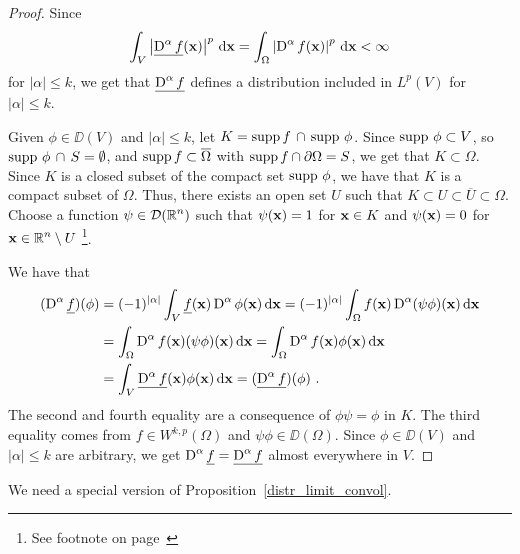\begin{proof}
Since
\[
\int_V \left|\underline{\operatorname{D}^\alpha f}(\mathbf{x})\right|^p \,\mathrm{d}{\mathbf{x}} = 
\int_{\Omega} \left| \operatorname{D}^\alpha f(\mathbf{x}) \right|^p \,\mathrm{d}{\mathbf{x}} < \infty
\]
for $|\alpha|\leq k$, we get that
$\displaystyle \underline{\operatorname{D}^\alpha f}$ defines a
distribution included in $\displaystyle L^p(V)$ for $|\alpha|\leq k$.

Given $\phi \in \DD(V)$ and $|\alpha|\leq k$, let
$K = \operatorname{supp} f\, \cap\, \operatorname{supp}\, \phi$.  Since $\operatorname{supp}\, \phi \subset V$, so
$\operatorname{supp}\, \phi\, \cap\, S = \emptyset$, and
$\operatorname{supp} f \subset \overline{\Omega}$ with  
$\operatorname{supp} f \cap \partial \Omega = S$, we get that $K \subset \Omega$.
Since $K$ is a closed subset of the compact set $\operatorname{supp}\, \phi$, we have
that $K$ is a compact subset of $\Omega$.  Thus, there exists an open
set $U$ such that $K \subset U \subset \overline{U} \subset \Omega$.
Choose a function $\displaystyle \psi \in \mathcal{D}(\mathbb{R}^n)$ such that
$\psi(\mathbf{x}) = 1$ for $\mathbf{x} \in K$ and
$\psi(\mathbf{x}) = 0$ for
$\displaystyle \mathbf{x} \in \mathbb{R}^n \setminus U$ \footnote{See
footnote on page~\pageref{FOOTNOTE1}}.

We have that
\begin{align*}
(\operatorname{D}^\alpha \underline{f})(\phi)
&= (-1)^{|\alpha|} \int_V \underline{f}(\mathbf{x})
\operatorname{D}^\alpha \phi(\mathbf{x})\,\mathrm{d}{\mathbf{x}}
= (-1)^{|\alpha|} \int_{\Omega} f(\mathbf{x})
\operatorname{D}^\alpha (\psi \phi)(\mathbf{x})\,\mathrm{d}{\mathbf{x}} \\
&= \int_{\Omega} \operatorname{D}^\alpha f(\mathbf{x}) (\psi \phi)(\mathbf{x})\,\mathrm{d}{\mathbf{x}}
= \int_{\Omega} \operatorname{D}^\alpha f(\mathbf{x}) \phi(\mathbf{x})\,\mathrm{d}{\mathbf{x}} \\
&= \int_V \underline{\operatorname{D}^\alpha f}(\mathbf{x}) \phi(\mathbf{x})\,\mathrm{d}{\mathbf{x}}
= (\underline{\operatorname{D}^\alpha f}) (\phi) \ .
\end{align*}
The second and fourth equality are a
consequence of $\phi \psi = \phi$ in $K$.  The third equality comes
from $\displaystyle f \in W^{k,p}(\Omega)$ and $\psi \phi \in \DD(\Omega)$.
Since $\phi \in \DD(V)$ and $|\alpha|\leq k$ are arbitrary,
we get $\displaystyle \operatorname{D}^\alpha \underline{f} = \underline{\operatorname{D}^\alpha f}$
almost everywhere in $V$.
\end{proof}

We need a special version of Proposition~\ref{distr_limit_convol}.

